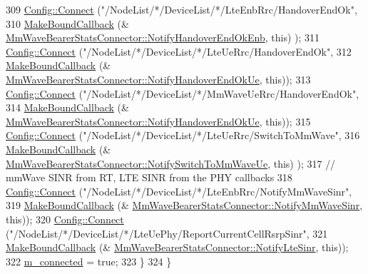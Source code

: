 \begin{DoxyCode}
309       \hyperlink{group__config_ga4014f151241cd0939b6cb64409605736}{Config::Connect} (\textcolor{stringliteral}{"/NodeList/*/DeviceList/*/LteEnbRrc/HandoverEndOk"},
310                        \hyperlink{group__makeboundcallback_ga1725d6362e6065faa0709f7c93f8d770}{MakeBoundCallback} (&
      \hyperlink{classns3_1_1MmWaveBearerStatsConnector_aad2a464af800763ebf5fd37fe2241c28}{MmWaveBearerStatsConnector::NotifyHandoverEndOkEnb}, \textcolor{keyword}{this})
      );
311       \hyperlink{group__config_ga4014f151241cd0939b6cb64409605736}{Config::Connect} (\textcolor{stringliteral}{"/NodeList/*/DeviceList/*/LteUeRrc/HandoverEndOk"},
312                        \hyperlink{group__makeboundcallback_ga1725d6362e6065faa0709f7c93f8d770}{MakeBoundCallback} (&
      \hyperlink{classns3_1_1MmWaveBearerStatsConnector_a8508fad62fbd6421001c7092ca96edbf}{MmWaveBearerStatsConnector::NotifyHandoverEndOkUe}, \textcolor{keyword}{this}));
313       \hyperlink{group__config_ga4014f151241cd0939b6cb64409605736}{Config::Connect} (\textcolor{stringliteral}{"/NodeList/*/DeviceList/*/MmWaveUeRrc/HandoverEndOk"},
314           \hyperlink{group__makeboundcallback_ga1725d6362e6065faa0709f7c93f8d770}{MakeBoundCallback} (&
      \hyperlink{classns3_1_1MmWaveBearerStatsConnector_a8508fad62fbd6421001c7092ca96edbf}{MmWaveBearerStatsConnector::NotifyHandoverEndOkUe}, \textcolor{keyword}{this}));
315       \hyperlink{group__config_ga4014f151241cd0939b6cb64409605736}{Config::Connect} (\textcolor{stringliteral}{"/NodeList/*/DeviceList/*/LteUeRrc/SwitchToMmWave"},
316            \hyperlink{group__makeboundcallback_ga1725d6362e6065faa0709f7c93f8d770}{MakeBoundCallback} (&
      \hyperlink{classns3_1_1MmWaveBearerStatsConnector_a4c346344bd63df7fbec533e3ca654001}{MmWaveBearerStatsConnector::NotifySwitchToMmWaveUe}, \textcolor{keyword}{this})
      );
317       \textcolor{comment}{// mmWave SINR from RT, LTE SINR from the PHY callbacks}
318       \hyperlink{group__config_ga4014f151241cd0939b6cb64409605736}{Config::Connect} (\textcolor{stringliteral}{"/NodeList/*/DeviceList/*/LteEnbRrc/NotifyMmWaveSinr"},
319           \hyperlink{group__makeboundcallback_ga1725d6362e6065faa0709f7c93f8d770}{MakeBoundCallback} (&
      \hyperlink{classns3_1_1MmWaveBearerStatsConnector_a4a4cd1cd9ff36c5e842f37f714311a82}{MmWaveBearerStatsConnector::NotifyMmWaveSinr}, \textcolor{keyword}{this}));
320       \hyperlink{group__config_ga4014f151241cd0939b6cb64409605736}{Config::Connect} (\textcolor{stringliteral}{"/NodeList/*/DeviceList/*/LteUePhy/ReportCurrentCellRsrpSinr"},
321                    \hyperlink{group__makeboundcallback_ga1725d6362e6065faa0709f7c93f8d770}{MakeBoundCallback} (&
      \hyperlink{classns3_1_1MmWaveBearerStatsConnector_a723f7b49276a0af43402ff9b55399412}{MmWaveBearerStatsConnector::NotifyLteSinr}, \textcolor{keyword}{this}));
322       \hyperlink{classns3_1_1MmWaveBearerStatsConnector_a2b34cc3a64fe43622592782563e55441}{m\_connected} = \textcolor{keyword}{true};
323     \}
324 \}
\end{DoxyCode}


